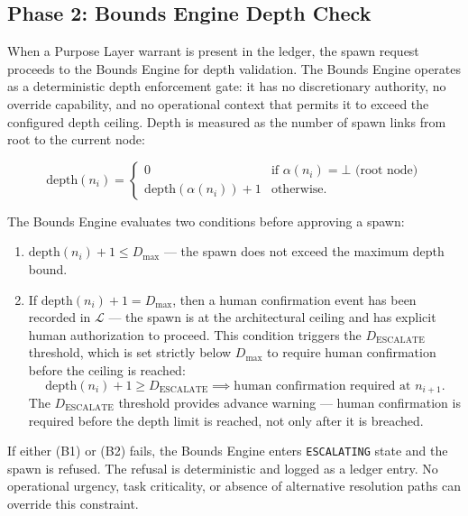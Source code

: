 \subsection{Phase 2: Bounds Engine Depth Check}
\label{sec:rs-phase2}

When a Purpose Layer warrant is present in the ledger, the spawn request proceeds to the Bounds Engine for depth validation. The Bounds Engine operates as a deterministic depth enforcement gate: it has no discretionary authority, no override capability, and no operational context that permits it to exceed the configured depth ceiling. Depth is measured as the number of spawn links from root to the current node:

\begin{equation}
\text{depth}(n_i) = 
\begin{cases}
0 & \text{if } \alpha(n_i) = \bot \text{ (root node)} \\[4pt]
\text{depth}(\alpha(n_i)) + 1 & \text{otherwise}.
\end{cases}
\label{eq:rs-depth}
\end{equation}

The Bounds Engine evaluates two conditions before approving a spawn:

\begin{enumerate}
    \item[(B1)] $\text{depth}(n_i) + 1 \leq D_{\max}$ — the spawn does not exceed the maximum depth bound.
    \item[(B2)] If $\text{depth}(n_i) + 1 = D_{\max}$, then a human confirmation event has been recorded in $\mathcal{L}$ — the spawn is at the architectural ceiling and has explicit human authorization to proceed. This condition triggers the $D_{\text{ESCALATE}}$ threshold, which is set strictly below $D_{\max}$ to require human confirmation before the ceiling is reached:
    \begin{equation}
    \text{depth}(n_i) + 1 \geq D_{\text{ESCALATE}} \implies \text{human confirmation required at } n_{i+1}.
    \label{eq:escalate-threshold}
    \end{equation}
    The $D_{\text{ESCALATE}}$ threshold provides advance warning — human confirmation is required before the depth limit is reached, not only after it is breached.
\end{enumerate}

If either (B1) or (B2) fails, the Bounds Engine enters \texttt{ESCALATING} state and the spawn is refused. The refusal is deterministic and logged as a ledger entry. No operational urgency, task criticality, or absence of alternative resolution paths can override this constraint.

